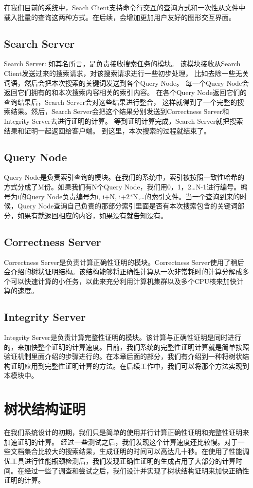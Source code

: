在我们目前的系统中，Seach Client支持命令行交互的查询方式和一次性从文件中载入批量的查询这两种方式。在后续，会增加更加用户友好的图形交互界面。

\subsection{Search Server}
Search Server: 如其名所言，是负责接收搜索任务的模块。
该模块接收从Search Client发送过来的搜索请求，对该搜索请求进行一些初步处理，
比如去除一些无关词语，然后会把本次搜索的关键词发送到各个Query Node。
每一个Query Node会返回它们拥有的和本次搜索内容相关的索引内容。
在各个Query Node返回它们的查询结果后，Search Server会对这些结果进行整合，
这样就得到了一个完整的搜索结果。然后，Search Server会把这个结果分别发送到Correctness Server和Integrity Server去进行证明的计算。
等到证明计算完成，Search Server就把搜索结果和证明一起返回给客户端。
到这里，本次搜索的过程就结束了。

\subsection{Query Node}
Query Node是负责索引查询的模块。在我们的系统中，索引被按照一致性哈希的方式分成了M份。如果我们有N个Query Node，我们用0，1，2…N-1进行编号。编号为i的Query Node负责编号为i, i+N, i+2*N,…的索引文件。当一个查询到来的时候，Query Node查询自己负责的那部分索引里面是否有本次搜索包含的关键词部分，如果有就返回相应的内容，如果没有就告知没有。

\subsection{Correctness Server}
Correctness Server是负责计算正确性证明的模块。Correctness Server使用了稍后会介绍的树状证明结构。该结构能够将正确性计算从一次非常耗时的计算分解成多个可以快速计算的小任务，以此来充分利用计算机集群以及多个CPU核来加快计算的速度。

\subsection{Integrity Server}
Integrity Server是负责计算完整性证明的模块。该计算与正确性证明是同时进行的，来加快整个证明的计算速度。目前，我们系统的完整性证明计算就是简单按照验证机制里面介绍的步骤进行的。在本章后面的部分，我们有介绍到一种将树状结构证明应用到完整性证明计算的方法。在后续工作中，我们可以将那个方法实现到本模块中。

\section{树状结构证明}
在我们系统设计的初期，我们只是简单的使用并行计算正确性证明和完整性证明来加速证明的计算。
经过一些测试之后，我们发现这个计算速度还比较慢。对于一些文档集合比较大的搜索结果，生成证明的时间可以高达几十秒。在使用了性能调优工具进行性能瓶颈检测后，我们发现正确性证明的生成占用了大部分的计算时间。在经过一些了调查和尝试之后，我们设计并实现了树状结构证明来加快正确性证明的计算。

